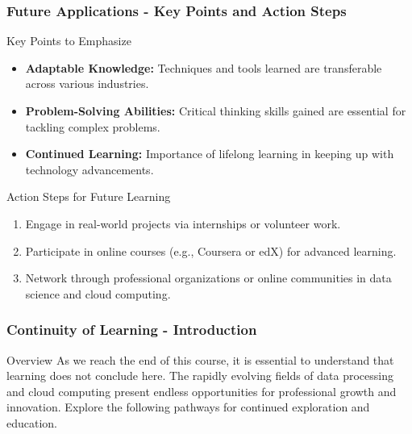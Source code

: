 \documentclass[aspectratio=169]{beamer}
\begin{document}
\begin{frame}[fragile]
    \frametitle{Future Applications - Key Points and Action Steps}
    
    \begin{block}{Key Points to Emphasize}
        \begin{itemize}
            \item \textbf{Adaptable Knowledge:} Techniques and tools learned are transferable across various industries.
            \item \textbf{Problem-Solving Abilities:} Critical thinking skills gained are essential for tackling complex problems.
            \item \textbf{Continued Learning:} Importance of lifelong learning in keeping up with technology advancements.
        \end{itemize}
    \end{block}
    
    \begin{block}{Action Steps for Future Learning}
        \begin{enumerate}
            \item Engage in real-world projects via internships or volunteer work.
            \item Participate in online courses (e.g., Coursera or edX) for advanced learning.
            \item Network through professional organizations or online communities in data science and cloud computing.
        \end{enumerate}
    \end{block}
\end{frame}

\begin{frame}[fragile]
    \frametitle{Continuity of Learning - Introduction}
    \begin{block}{Overview}
        As we reach the end of this course, it is essential to understand that learning does not conclude here. The rapidly evolving fields of data processing and cloud computing present endless opportunities for professional growth and innovation. Explore the following pathways for continued exploration and education.
    \end{block}
\end{frame}
\end{document}

